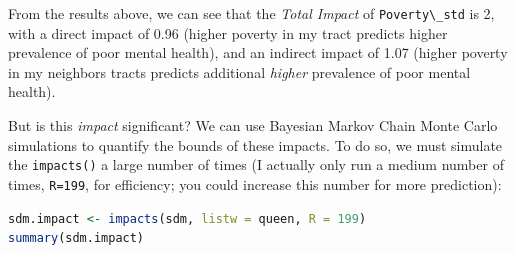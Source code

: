 \documentclass[
]{book}
\newcommand{\passthrough}[1]{#1}
\begin{document}
From the results above, we can see that the \emph{Total Impact} of \passthrough{\lstinline!Poverty\_std!} is 2, with a direct impact of 0.96 (higher poverty in my tract predicts higher prevalence of poor mental health), and an indirect impact of 1.07 (higher poverty in my neighbors tracts predicts additional \emph{higher} prevalence of poor mental health).

But is this \emph{impact} significant? We can use Bayesian Markov Chain Monte Carlo simulations to quantify the bounds of these impacts. To do so, we must simulate the \passthrough{\lstinline!impacts()!} a large number of times (I actually only run a medium number of times, \passthrough{\lstinline!R=199!}, for efficiency; you could increase this number for more prediction):

\begin{lstlisting}[language=R]
sdm.impact <- impacts(sdm, listw = queen, R = 199)
summary(sdm.impact)
\end{lstlisting}
\end{document}
